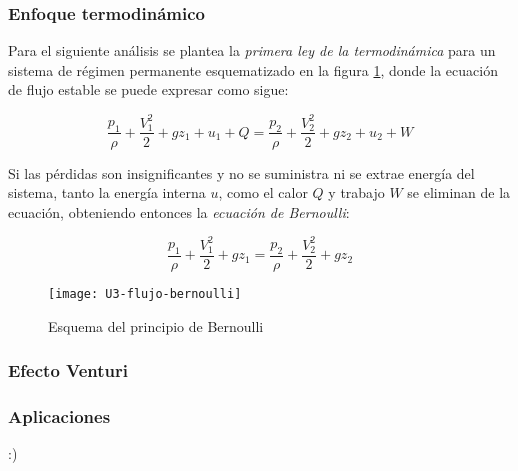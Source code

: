 \subsubsection{Enfoque termodinámico}

Para el siguiente análisis se plantea la \emph{primera ley de la termodinámica} para un sistema de régimen permanente esquematizado en la figura \ref{fig:ecuacion-de-bernoulli}, donde la ecuación de flujo estable se puede expresar como sigue:

\begin{equation*}
 \dfrac{p_1}{\rho} +	\dfrac{V_1^2}{2} + g z_1 + u_1 + Q=  \dfrac{p_2}{\rho} + \dfrac{V_2^2}{2} + g z_2 + u_2 + W
\end{equation*}


Si las pérdidas son insignificantes y no se suministra ni se extrae energía del sistema, tanto la energía interna $u$, como el calor $Q$ y trabajo $W$ se eliminan de la ecuación, obteniendo entonces la \emph{ecuación de Bernoulli}:

\begin{equation}
	\dfrac{p_1}{\rho} +	\dfrac{V_1^2}{2} + g z_1 =  \dfrac{p_2}{\rho} + \dfrac{V_2^2}{2} + g z_2
	\label{eq:bernoulli}
\end{equation}

\begin{figure}[H]
	\centering
	\texttt{[image: U3-flujo-bernoulli]}
	\caption{Esquema del principio de Bernoulli}
	\label{fig:ecuacion-de-bernoulli}
\end{figure}

\subsubsection{Efecto Venturi}

\subsubsection{Aplicaciones}

:)



